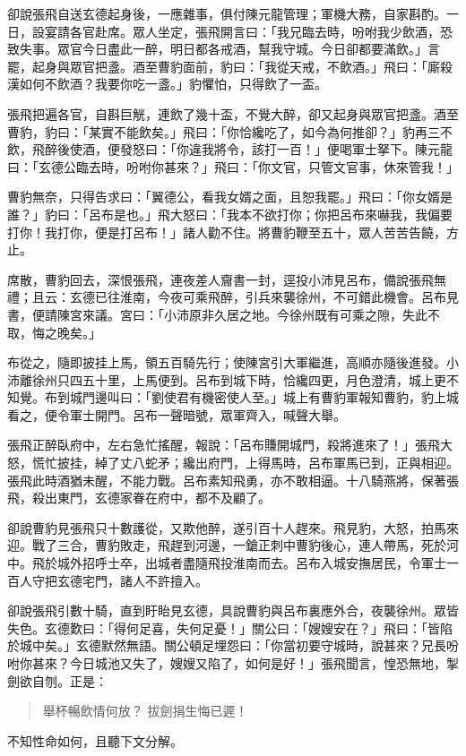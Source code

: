 卻說張飛自送玄德起身後，一應雜事，俱付陳元龍管理；軍機大務，自家斟酌。一日，設宴請各官赴席。眾人坐定，張飛開言曰：「我兄臨去時，吩咐我少飲酒，恐致失事。眾官今日盡此一醉，明日都各戒酒，幫我守城。今日卻都要滿飲。」言罷，起身與眾官把盞。酒至曹豹面前，豹曰：「我從天戒，不飲酒。」飛曰：「廝殺漢如何不飲酒？我要你吃一盞。」豹懼怕，只得飲了一盃。

張飛把遍各官，自斟巨觥，連飲了幾十盃，不覺大醉，卻又起身與眾官把盞。酒至曹豹，豹曰：「某實不能飲矣。」飛曰：「你恰纔吃了，如今為何推卻？」豹再三不飲，飛醉後使酒，便發怒曰：「你違我將令，該打一百！」便喝軍士拏下。陳元龍曰：「玄德公臨去時，吩咐你甚來？」飛曰：「你文官，只管文官事，休來管我！」

曹豹無奈，只得告求曰：「翼德公，看我女婿之面，且恕我罷。」飛曰：「你女婿是誰？」豹曰：「呂布是也。」飛大怒曰：「我本不欲打你；你把呂布來嚇我，我偏要打你！我打你，便是打呂布！」諸人勸不住。將曹豹鞭至五十，眾人苦苦告饒，方止。

席散，曹豹回去，深恨張飛，連夜差人齎書一封，逕投小沛見呂布，備說張飛無禮；且云：玄德已往淮南，今夜可乘飛醉，引兵來襲徐州，不可錯此機會。呂布見書，便請陳宮來議。宮曰：「小沛原非久居之地。今徐州既有可乘之隙，失此不取，悔之晚矣。」

布從之，隨即披挂上馬，領五百騎先行；使陳宮引大軍繼進，高順亦隨後進發。小沛離徐州只四五十里，上馬便到。呂布到城下時，恰纔四更，月色澄清，城上更不知覺。布到城門邊叫曰：「劉使君有機密使人至。」城上有曹豹軍報知曹豹，豹上城看之，便令軍士開門。呂布一聲暗號，眾軍齊入，喊聲大舉。

張飛正醉臥府中，左右急忙搖醒，報說：「呂布賺開城門，殺將進來了！」張飛大怒，慌忙披挂，綽了丈八蛇矛；纔出府門，上得馬時，呂布軍馬已到，正與相迎。張飛此時酒猶未醒，不能力戰。呂布素知飛勇，亦不敢相逼。十八騎燕將，保著張飛，殺出東門，玄德家眷在府中，都不及顧了。

卻說曹豹見張飛只十數護從，又欺他醉，遂引百十人趕來。飛見豹，大怒，拍馬來迎。戰了三合，曹豹敗走，飛趕到河邊，一鎗正刺中曹豹後心，連人帶馬，死於河中。飛於城外招呼士卒，出城者盡隨飛投淮南而去。呂布入城安撫居民，令軍士一百人守把玄德宅門，諸人不許擅入。

卻說張飛引數十騎，直到盱眙見玄德，具說曹豹與呂布裏應外合，夜襲徐州。眾皆失色。玄德歎曰：「得何足喜，失何足憂！」關公曰：「嫂嫂安在？」飛曰：「皆陷於城中矣。」玄德默然無語。關公頓足埋怨曰：「你當初要守城時，說甚來？兄長吩咐你甚來？今日城池又失了，嫂嫂又陷了，如何是好！」張飛聞言，惶恐無地，掣劍欲自刎。正是：

\begin{quote}
舉杯暢飲情何放？
拔劍捐生悔已遲！
\end{quote}

不知性命如何，且聽下文分解。
